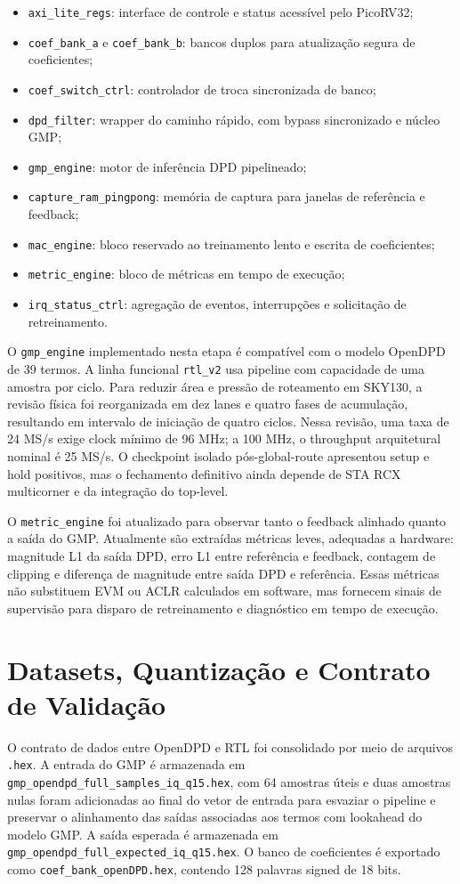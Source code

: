 \documentclass[journal,comsoc]{IEEEtran}
\begin{document}
\begin{itemize}
    \item \texttt{axi\_lite\_regs}: interface de controle e status acessível pelo PicoRV32;
    \item \texttt{coef\_bank\_a} e \texttt{coef\_bank\_b}: bancos duplos para atualização segura de coeficientes;
    \item \texttt{coef\_switch\_ctrl}: controlador de troca sincronizada de banco;
    \item \texttt{dpd\_filter}: wrapper do caminho rápido, com bypass sincronizado e núcleo GMP;
    \item \texttt{gmp\_engine}: motor de inferência DPD pipelineado;
    \item \texttt{capture\_ram\_pingpong}: memória de captura para janelas de referência e feedback;
    \item \texttt{mac\_engine}: bloco reservado ao treinamento lento e escrita de coeficientes;
    \item \texttt{metric\_engine}: bloco de métricas em tempo de execução;
    \item \texttt{irq\_status\_ctrl}: agregação de eventos, interrupções e solicitação de retreinamento.
\end{itemize}

O \texttt{gmp\_engine} implementado nesta etapa é compatível com o modelo OpenDPD de 39 termos. A linha funcional \texttt{rtl\_v2} usa pipeline com capacidade de uma amostra por ciclo. Para reduzir área e pressão de roteamento em SKY130, a revisão física foi reorganizada em dez lanes e quatro fases de acumulação, resultando em intervalo de iniciação de quatro ciclos. Nessa revisão, uma taxa de 24 MS/s exige clock mínimo de 96 MHz; a 100 MHz, o throughput arquitetural nominal é 25 MS/s. O checkpoint isolado pós-global-route apresentou setup e hold positivos, mas o fechamento definitivo ainda depende de STA RCX multicorner e da integração do top-level.

O \texttt{metric\_engine} foi atualizado para observar tanto o feedback alinhado quanto a saída do GMP. Atualmente são extraídas métricas leves, adequadas a hardware: magnitude L1 da saída DPD, erro L1 entre referência e feedback, contagem de clipping e diferença de magnitude entre saída DPD e referência. Essas métricas não substituem EVM ou ACLR calculados em software, mas fornecem sinais de supervisão para disparo de retreinamento e diagnóstico em tempo de execução.

\section{Datasets, Quantização e Contrato de Validação}
O contrato de dados entre OpenDPD e RTL foi consolidado por meio de arquivos \texttt{.hex}. A entrada do GMP é armazenada em \texttt{gmp\_opendpd\_full\_samples\_iq\_q15.hex}, com 64 amostras úteis e duas amostras nulas foram adicionadas ao final do vetor de entrada para esvaziar o pipeline e preservar o alinhamento das saídas associadas aos termos com lookahead do modelo GMP. A saída esperada é armazenada em \texttt{gmp\_opendpd\_full\_expected\_iq\_q15.hex}. O banco de coeficientes é exportado como \texttt{coef\_bank\_openDPD.hex}, contendo 128 palavras signed de 18 bits.
\end{document}
